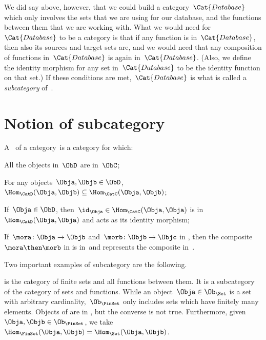 We did say above, however, that we could build a category~$\Cat{Database}$ which only involves the sets that we are using for our database, and the functions between them that we are working with. What we would need for~$\Cat{Database}$ to be a category is that if any function is in~$\Cat{Database}$, then also its sources and target sets are, and we would need that any composition of functions in~$\Cat{Database}$ is again in~$\Cat{Database}$. (Also, we define the identity morphism for any set in~$\Cat{Database}$ to be the identity function on that set.) If these conditions are met,~$\Cat{Database}$ is what is called a \emph{subcategory} of~\Set.


\section{Notion of subcategory}
\begin{ctdefinition}[Subcategory]
    \label{def:subcategory}
    A \emph{}~\CatD of a category~\CatC is a category for which:
    \begin{compactenum}
        \item All the objects in~$\ObD$ are in~$\ObC$;
        \item For any objects~$\Obja,\Objb\in \ObD$,~$\Hom_\CatD(\Obja,\Objb)\subseteq \Hom_\CatC(\Obja,\Objb)$;
        \item If~$\Obja\in \ObD$, then~$\id_\Obja \in \Hom_\CatC(\Obja,\Obja)$ is in~$\Hom_\CatD(\Obja,\Obja)$ and acts as its identity morphism;
        \item If~$\mora \colon \Obja \to \Objb$ and~$\morb\colon \Objb\to \Objc$ in \CatD, then the composite~$\mora \then \morb$ in \CatC is in~\CatD and represents the composite in~\CatD.
    \end{compactenum}
\end{ctdefinition}

Two important examples of subcategory are the following.

\begin{example}
    \iindex{\FinSet} is the category of finite sets and all functions between them. It is a subcategory of the category \Set of sets and functions. While an object~$\Obja \in \Ob_\Set$ is a set with arbitrary cardinality,~$\Ob_{\FinSet}$ only includes sets which have finitely many elements. Objects of \FinSet are in \Set, but the converse is not true. Furthermore, given~$\Obja,\Objb\in \Ob_\FinSet$, we take~$\Hom_{\FinSet}(\Obja,\Objb)=\Hom_{\Set}(\Obja,\Objb)$.
\end{example}


